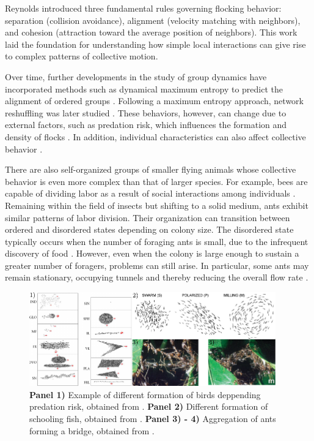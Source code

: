 Reynolds introduced three fundamental rules governing flocking behavior: separation (collision avoidance), alignment (velocity matching with neighbors), and cohesion (attraction toward the average position of neighbors). This work laid the foundation for understanding how simple local interactions can give rise to complex patterns of collective motion. 

Over time, further developments in the study of group dynamics have incorporated methods such as dynamical maximum entropy to predict the alignment of ordered groups \cite{cavagna2014dynamical}. Following a maximum entropy approach, network reshuffling was later studied \cite{mora1511questioning}. These behaviors, however, can change due to external factors, such as predation risk, which influences the formation and density of flocks \cite{carere2009aerial}. In addition, individual characteristics can also affect collective behavior \cite{couzin2002collective}.


There are also self-organized groups of smaller flying animals whose collective behavior is even more complex than that of larger species. For example, bees are capable of dividing labor as a result of social interactions among individuals \cite{jeanson2005emergence}. Remaining within the field of insects but shifting to a solid medium, ants exhibit similar patterns of labor division. Their organization can transition between ordered and disordered states depending on colony size. The disordered state typically occurs when the number of foraging ants is small, due to the infrequent discovery of food \cite{beekman2001phase}. However, even when the colony is large enough to sustain a greater number of foragers, problems can still arise. In particular, some ants may remain stationary, occupying tunnels and thereby reducing the overall flow rate \cite{aguilar2018collective}.

\begin{figure}
  \begin{center}
    \includegraphics[width=0.95\textwidth]{figures/macroscopicagents.pdf}
  \end{center}
  \caption[Macroscopic Agents example]{\textbf{Panel 1)} Example of different formation of birds deppending predation risk, obtained from \cite{carere2009aerial}. \textbf{Panel 2)} Different formation of schooling fish, obtained from \cite{tunstrom2013collective}. \textbf{Panel 3) - 4)} Aggregation of ants forming a bridge, obtained from \cite{anderson2002self}.}\label{fig:macroscopicagents}
\end{figure}


